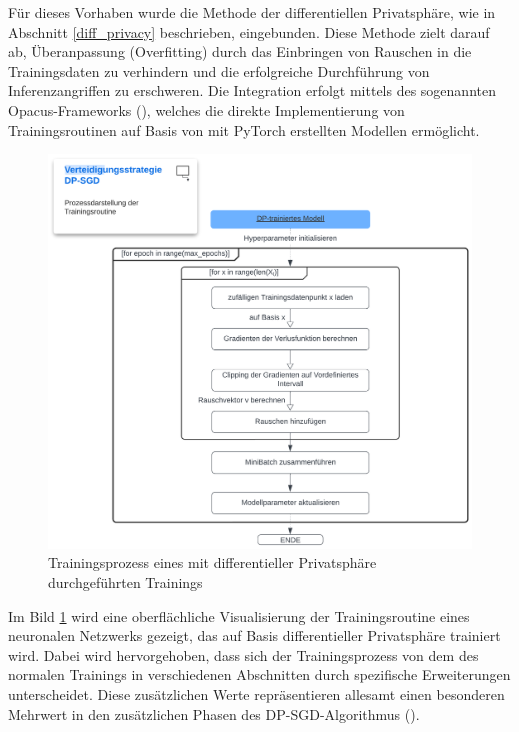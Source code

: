 Für dieses Vorhaben wurde die Methode der differentiellen Privatsphäre, wie in Abschnitt \ref{diff_privacy} beschrieben, eingebunden. Diese Methode zielt darauf ab, Überanpassung (Overfitting) durch das Einbringen von Rauschen in die Trainingsdaten zu verhindern und die erfolgreiche Durchführung von Inferenzangriffen zu erschweren. Die Integration erfolgt mittels des sogenannten Opacus-Frameworks (\cite{noauthor_opacus_nodate}), welches die direkte Implementierung von Trainingsroutinen auf Basis von mit PyTorch erstellten Modellen ermöglicht.

\begin{figure}[H]
	\centering
	\hspace{-1.5cm}
	\includegraphics[width=0.9\linewidth]{Bilder/dpsgd.png}
	\caption{Trainingsprozess eines mit differentieller Privatsphäre durchgeführten Trainings}
	\label{img:dpsgd}
\end{figure}

Im Bild \ref{img:dpsgd} wird eine oberflächliche Visualisierung der Trainingsroutine eines neuronalen Netzwerks gezeigt, das auf Basis differentieller Privatsphäre trainiert wird. Dabei wird hervorgehoben, dass sich der Trainingsprozess von dem des \glqq normalen\grqq{} Trainings in verschiedenen Abschnitten durch spezifische Erweiterungen unterscheidet. Diese zusätzlichen Werte repräsentieren allesamt einen besonderen Mehrwert in den zusätzlichen Phasen des DP-SGD-Algorithmus (\cite[3]{abadi_deep_2016}).

